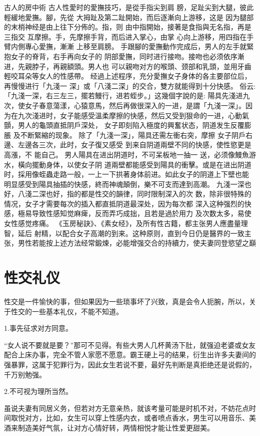 \documentclass[12pt,UTF8]{ctexbook}
\begin{document}
古人的房中術
古人性愛时的愛撫技巧，是從手指尖到肩
膀，足趾尖到大腿，彼此輕緩地愛撫。腳，先從
大拇趾及第二趾開始，而后逐漸向上游移，这是
因为腿部的末梢神经是由上往下分佈的。指，则
由中指開始，接著是食指與无名指，再是三指交
互摩擦。手，先摩擦手背，而后进入掌心，由掌
心向上游移，用四指在手臂内側專心愛撫，漸漸
上移至肩膀。
手跟腳的愛撫動作完成后，男人的左手就緊抱女子的脊背，右手再向女子的
阴部愛撫，同时进行接吻。接吻也必须依序漸进，先親脖子，再親額頭。男人也
可以親吻对方的喉頭、颈部和乳頭，並用牙齒輕咬耳朵等女人的性感帶。
经過上述程序，充分愛撫女子身体的各主要部位后，再慢慢进行「九淺一
深」或「八淺二深」的交合，雙方就能得到十分快感。
俗云:「九淺一深，右三左三，擺若鰻行，进若蛭步。」这幾個字說的是:
陽具先淺进九次，使女子春意蕩漾，心猿意馬，然后再做很深入的一进，是謂「九淺一深」。因为在九次淺进时，女子能感受溫柔摩擦的快感，然后又受到狠命的一进，心動氣顫，男人的龜頭直抵阴戶深处，
女子即刻陷入極度的興奮状态，阴道发生反覆膨脹
及不断緊縮的现象。
除了「九淺一深」，陽具还需左衝右突，摩擦
女子阴戶右邊、左邊各三次，此时，女子復又感受
到来自阴道兩壁不同的快感，使性慾更是高漲，不
能自己。
男人陽具在进出阴道时，不可呆板地一抽一
送，必须像鰻魚游水，橫向擺動身体，以使女子阴
道兩壁都能感受到陽具的衝擊。或是在进出阴道
时，採用像蛭蟲走路一般，一上一下拱著身体前进。如此女子的阴道上下壁也能
明显感受到陽具抽插的快感，終而神魂顛倒，樂不可支而達到高潮。
九淺一深也好，八淺二深也好，指的都是性交的韻律，同时限制深入的次
数，除非很特殊的情况，女子才需要每次的插入都直抵阴道最深处，因为每次都
深入这种强烈的快感，極易导致性感知觉麻痺，反而弄巧成拙，且若是過於用力
及次数太多，易使女性感觉疼痛。
《玉房秘訣》、《素女经》，及所有性古籍，都主张男人應盡量理智，延后
射精，以配合女子高潮的到来。这种原则，直到今日仍是醫界的一致主张，男性若能按上述方法经常鍛煉，必能增强交合的持續力，使夫妻同登慾望之巔

\chapter{性交礼仪}

性交是一件愉快的事，但如果因为一些琐事坏了兴致，真是会令人扼腕，所以，关于性交的一些基本礼仪，不能不知道。

1.事先征求对方同意。

“女人说不要就是要？”那可不见得。有些大男人几杯黄汤下肚，就强迫老婆或女友配合上床办事，完全不管人家愿不愿意。霸王硬上弓的结果，衍生出许多夫妻间的强暴罪，这属于犯罪行为，因此女生若说不要，最好先判断是真拒绝还是说假的，千万别勉强。

2.不可视为理所当然。

虽说夫妻有同居义务，但若对方无意亲热，就该考量可能是时机不对，不妨花点时间取悦对方，比如，女生可以穿上性感内衣，或者喷点香水，男生可以用音乐、美酒来制造美好气氛，让对方心情好转，两情相悦才能让性爱更甜美。
\end{document}
